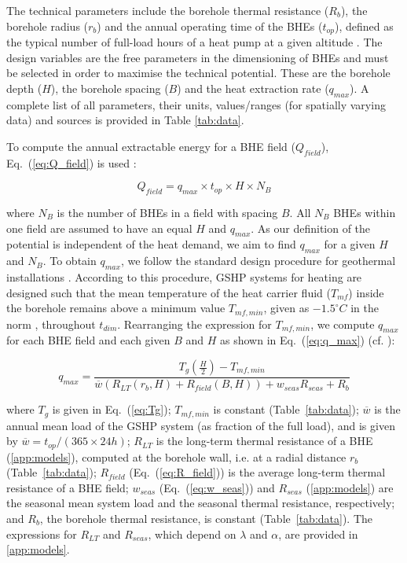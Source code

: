 The technical parameters include the borehole thermal resistance ($R_b$), the borehole radius ($r_b$) and the annual operating time of the BHEs ($t_{op}$), defined as the typical number of full-load hours of a heat pump at a given altitude \cite{sia_sondes_2010}. 
The design variables are the free parameters in the dimensioning of BHEs and must be selected in order to maximise the technical potential. 
These are the borehole depth ($H$), the borehole spacing ($B$) and the heat extraction rate ($q_{max}$). 
A complete list of all parameters, their units, values/ranges (for spatially varying data) and sources is provided in Table \ref{tab:data}.  

To compute the annual extractable energy for a BHE field ($Q_{field}$), Eq.~(\ref{eq:Q_field}) is used \cite{pahud_geothermal_2002}:

\begin{equation}
\label{eq:Q_field}
    Q_{field}=q_{max} \times t_{op} \times H \times N_B
\end{equation}

where $N_B$ is the number of BHEs in a field with spacing $B$. All $N_B$ BHEs within one field are assumed to have an equal $H$ and $q_{max}$.
As our definition of the potential is independent of the heat demand, we aim to find $q_{max}$ for a given $H$ and $N_B$.
To obtain $q_{max}$, we follow the standard design procedure for geothermal installations \cite{kavanaugh_geothermal_2014, spitler_vertical_2016, pahud_geothermal_2002}. 
According to this procedure, GSHP systems for heating are designed such that the mean temperature of the heat carrier fluid ($T_{mf}$) inside the borehole remains above a minimum value $T_{mf, min}$, given as $-1.5 ^\circ C$ in the norm \cite{sia_sondes_2010}, throughout $t_{dim}$. 
Rearranging the expression for $T_{mf, min}$, we compute $q_{max}$ for each BHE field and each given $B$ and $H$ as shown in Eq.~(\ref{eq:q_max}) (cf. \cite{pahud_geothermal_2002}):

\begin{equation}
\label{eq:q_max}
    q_{max} = \frac{T_g(\frac{H}{2}) - T_{mf, min}}{\overline{w}(R_{LT}(r_b, H) + R_{field}(B, H)) + w_{seas} R_{seas} + R_b}
\end{equation}


where $T_g$ is given in Eq.~(\ref{eq:Tg}); $T_{mf, min}$ is constant (Table~\ref{tab:data});
$\overline{w}$ is the annual mean load of the GSHP system (as fraction of the full load), and is given by $\overline{w} = t_{op}/ (365 \times 24h)$;
$R_{LT}$ is the long-term thermal resistance of a BHE (\ref{app:models}), computed at the borehole wall, i.e. at a radial distance $r_b$ (Table~\ref{tab:data});
$R_{field}$ (Eq.~(\ref{eq:R_field})) is the average long-term thermal resistance of a BHE field; %
$w_{seas}$  (Eq.~(\ref{eq:w_seas})) and $R_{seas}$ (\ref{app:models}) are the seasonal mean system load %
and the seasonal thermal resistance, respectively; 
and $R_b$, the borehole thermal resistance, is constant (Table~\ref{tab:data}).
The expressions for $R_{LT}$ and $R_{seas}$, which depend on $\lambda$ and $\alpha$, are provided in \ref{app:models}. 

